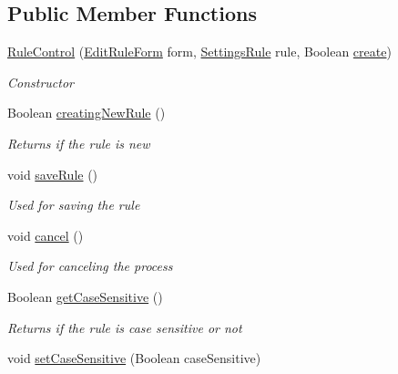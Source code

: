 \subsection*{Public Member Functions}
\begin{DoxyCompactItemize}
\item 
\hyperlink{class_web_analyzer_1_1_u_i_1_1_interaction_objects_1_1_rule_control_a8750fd77bb6508af4f27245be105a4cd}{Rule\+Control} (\hyperlink{class_web_analyzer_1_1_u_i_1_1_edit_rule_form}{Edit\+Rule\+Form} form, \hyperlink{class_web_analyzer_1_1_models_1_1_settings_model_1_1_settings_rule}{Settings\+Rule} rule, Boolean \hyperlink{_u_i_2_h_t_m_l_resources_2js_2lib_2underscore_8min_8js_a8bd5981157799459d39a59e8c4a0de04}{create})
\begin{DoxyCompactList}\small\item\em Constructor \end{DoxyCompactList}\item 
Boolean \hyperlink{class_web_analyzer_1_1_u_i_1_1_interaction_objects_1_1_rule_control_a536423d979ea29cbc78acd7af260e047}{creating\+New\+Rule} ()
\begin{DoxyCompactList}\small\item\em Returns if the rule is new \end{DoxyCompactList}\item 
void \hyperlink{class_web_analyzer_1_1_u_i_1_1_interaction_objects_1_1_rule_control_a94100d3e36e224ebf511dc3f8c18ca27}{save\+Rule} ()
\begin{DoxyCompactList}\small\item\em Used for saving the rule \end{DoxyCompactList}\item 
void \hyperlink{class_web_analyzer_1_1_u_i_1_1_interaction_objects_1_1_rule_control_a800eb65fd64f59274eef8862feb1aa16}{cancel} ()
\begin{DoxyCompactList}\small\item\em Used for canceling the process \end{DoxyCompactList}\item 
Boolean \hyperlink{class_web_analyzer_1_1_u_i_1_1_interaction_objects_1_1_rule_control_a8dab0dfc04ad5b917a3f0b0d66e3b26f}{get\+Case\+Sensitive} ()
\begin{DoxyCompactList}\small\item\em Returns if the rule is case sensitive or not \end{DoxyCompactList}\item 
void \hyperlink{class_web_analyzer_1_1_u_i_1_1_interaction_objects_1_1_rule_control_a2d4fe3b5e5bb273fc4289dffa1e9672b}{set\+Case\+Sensitive} (Boolean case\+Sensitive)

\end{DoxyCompactItemize}
